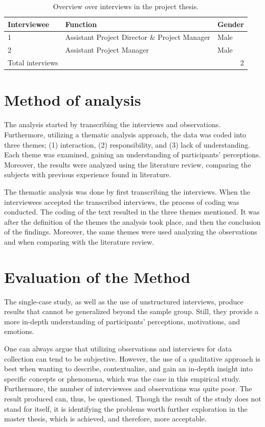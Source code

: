 \begin{table}
    \begin{center}
        \begin{tabular}{@{}lll@{}}
        \toprule
        \textbf{Interviewee} & \textbf{Function}          & \textbf{Gender} \\ \midrule
        1                    & Assistant Project Director \& Project Manager & Male            \\
        2                    & Assistant Project Manager  & Male            \\
        Total interviews     & \multicolumn{2}{r}{2}                        \\ \bottomrule
        \end{tabular}
        \caption{Overview over interviews in the project thesis.}
        \label{tab:paticipants}
    \end{center}
\end{table}

\section{Method of analysis}
The analysis started by transcribing the interviews and observations. Furthermore, utilizing a thematic analysis approach, the data was coded into three themes; (1) interaction, (2) responsibility, and (3) lack of understanding. Each theme was examined, gaining an understanding of participants' perceptions. Moreover, the results were analyzed using the literature review, comparing the subjects with previous experience found in literature. 

The thematic analysis was done by first transcribing the interviews. When the interviewees accepted the transcribed interviews, the process of coding was conducted. The coding of the text resulted in the three themes mentioned. It was after the definition of the themes the analysis took place, and then the conclusion of the findings. Moreover, the same themes were used analyzing the observations and when comparing with the literature review.

\section{Evaluation of the Method}
The single-case study, as well as the use of unstructured interviews, produce results that cannot be generalized beyond the sample group. Still, they provide a more in-depth understanding of participants’ perceptions, motivations, and emotions. 

One can always argue that utilizing observations and interviews for data collection can tend to be subjective. However, the use of a qualitative approach is best when wanting to describe, contextualize, and gain an in-depth insight into specific concepts or phenomena, which was the case in this empirical study. Furthermore, the number of interviewees and observations was quite poor. The result produced can, thus, be questioned. Though the result of the study does not stand for itself, it is identifying the problems worth further exploration in the master thesis, which is achieved, and therefore, more acceptable.

\cleardoublepage